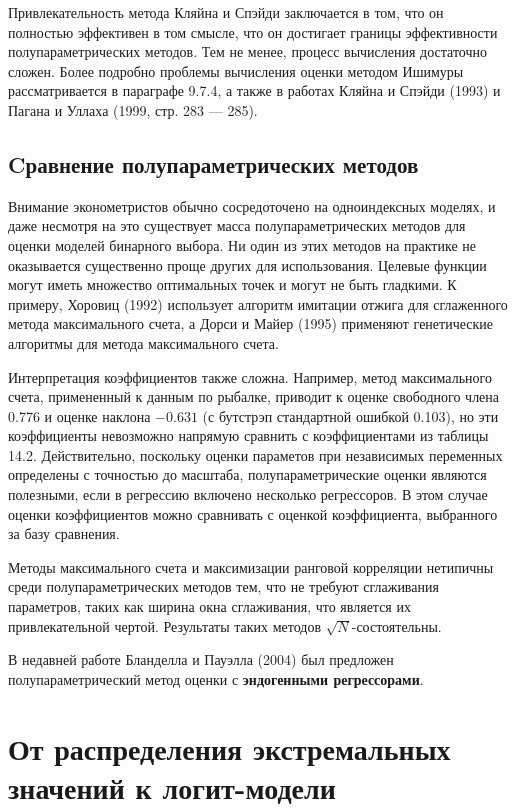 Привлекательность метода Кляйна и Спэйди заключается в том,  что он полностью эффективен в том смысле,  что он достигает границы эффективности полупараметрических методов. Тем не менее,  процесс вычисления достаточно сложен. Более подробно проблемы вычисления оценки методом Ишимуры рассматривается в параграфе 9.7.4,  а также в работах Кляйна и Спэйди (1993) и Пагана и Уллаха (1999, стр. 283 --- 285).  

\subsection{Cравнение полупараметрических методов}

Внимание эконометристов обычно сосредоточено на одноиндексных моделях,  и даже несмотря на это существует масса полупараметрических методов для оценки моделей бинарного выбора. Ни один из этих методов на практике не оказывается существенно проще других для использования. Целевые функции могут иметь множество оптимальных точек и могут не быть гладкими. К примеру,  Хоровиц  (1992)  использует алгоритм имитации отжига для сглаженного метода максимального счета,  а Дорси и Майер  (1995)  применяют генетические алгоритмы для метода максимального счета.

Интерпретация коэффициентов также сложна. Например,  метод максимального счета,  примененный к данным по рыбалке,  приводит к оценке свободного члена 0.776 и оценке наклона $-0.631$ (с бутстрэп стандартной ошибкой 0.103),  но эти коэффициенты невозможно напрямую сравнить с коэффициентами из таблицы 14.2. Действительно,  поскольку оценки параметов при независимых переменных определены с точностью до масштаба,  полупараметрические оценки являются полезными,  если в регрессию включено несколько регрессоров. В этом случае оценки  коэффициентов можно сравнивать с оценкой коэффициента, выбранного за  базу сравнения.

Методы максимального счета и максимизации ранговой корреляции нетипичны среди полупараметрических методов тем,  что не требуют сглаживания параметров,  таких как ширина окна сглаживания,  что является их привлекательной чертой. Результаты таких методов $\sqrt{N}$-состоятельны.

В недавней работе Бланделла и Пауэлла  (2004)  был предложен полупараметрический метод оценки с \textbf{эндогенными регрессорами}.

\section{От распределения экстремальных значений к логит-модели}

